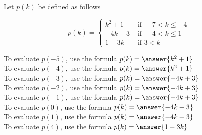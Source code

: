 \documentclass{ximera}
\author{Lee Wayand}
\begin{document}
\begin{exercise}




Let $p(k)$ be defined as follows.

\[
p(k) = 
\begin{cases}
  k^2 + 1 & \text{ if } -7 < k \leq -4 \\
  -4k + 3 & \text{ if } -4 < k \leq 1 \\
  1 - 3k & \text{ if } 3 < k
\end{cases}
\]



To evaluate $p(-5)$, use the formula $p(k) = \answer{k^2 + 1}$ \\


To evaluate $p(-4)$, use the formula $p(k) = \answer{k^2 + 1}$ \\


To evaluate $p(-3)$, use the formula $p(k) = \answer{-4k + 3}$ \\


To evaluate $p(-2)$, use the formula $p(k) = \answer{-4k + 3}$ \\


To evaluate $p(-1)$, use the formula $p(k) = \answer{-4k + 3}$ \\


To evaluate $p(0)$, use the formula $p(k) = \answer{-4k + 3}$ \\


To evaluate $p(1)$, use the formula $p(k) = \answer{-4k + 3}$ \\





To evaluate $p(4)$, use the formula $p(k) = \answer{1 - 3k}$ \\


\end{exercise}
\end{document}
